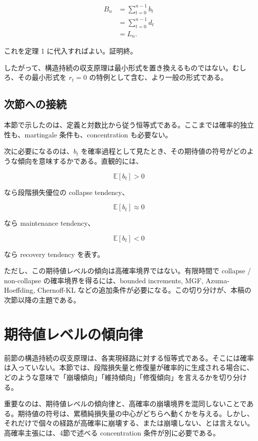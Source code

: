 \documentclass[12pt,a4paper]{article}
\begin{document}
\[
\begin{aligned}
B_{n} &= \sum_{t=0}^{n-1} b_{t} \\
&= \sum_{t=0}^{n-1} d_{t} \\
&= L_{n}.
\end{aligned}
\]

これを定理 1 に代入すればよい。証明終。

したがって、構造持続の収支原理は最小形式を置き換えるものではない。むしろ、その最小形式を \(r_{t}=0\) の特例として含む、より一般の形式である。

\subsection{次節への接続}\label{ux6b21ux7bc0ux3078ux306eux63a5ux7d9a}

本節で示したのは、定義と対数比から従う恒等式である。ここまでは確率的独立性も、martingale 条件も、concentration も必要ない。

次に必要になるのは、\(b_{t}\) を確率過程として見たとき、その期待値の符号がどのような傾向を意味するかである。直観的には、

\[
\mathbb E[b_{t}] > 0
\]

なら段階損失優位の collapse tendency、

\[
\mathbb E[b_{t}] \approx 0
\]

なら maintenance tendency、

\[
\mathbb E[b_{t}] < 0
\]

なら recovery tendency を表す。

ただし、この期待値レベルの傾向は高確率境界ではない。有限時間で collapse / non-collapse の確率境界を得るには、bounded increments, MGF, Azuma-Hoeffding, Chernoff-KL などの追加条件が必要になる。この切り分けが、本稿の次節以降の主題である。

\section{期待値レベルの傾向律}\label{ux671fux5f85ux5024ux30ecux30d9ux30ebux306eux50beux5411ux5f8b}

前節の構造持続の収支原理は、各実現経路に対する恒等式である。そこには確率は入っていない。本節では、段階損失量と修復量が確率的に生成される場合に、どのような意味で「崩壊傾向」「維持傾向」「修復傾向」を言えるかを切り分ける。

重要なのは、期待値レベルの傾向律と、高確率の崩壊境界を混同しないことである。期待値の符号は、累積純損失量の中心がどちらへ動くかを与える。しかし、それだけで個々の経路が高確率に崩壊する、または崩壊しない、とは言えない。高確率主張には、4節で述べる concentration 条件が別に必要である。
\end{document}
